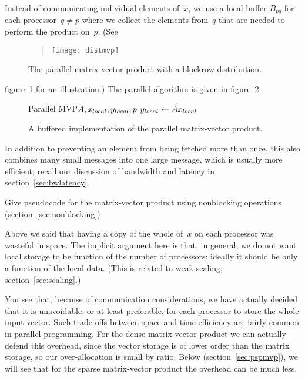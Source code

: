 Instead of communicating individual elements of~$x$, we use a local
buffer $B_{pq}$ for each processor~$q\not=p$ where we collect the
elements from~$q$ that are needed to perform the product on~$p$. (See
\begin{figure}
  \begin{quote}
    \texttt{[image: distmvp]}
  \end{quote}
  \caption{The parallel matrix-vector product with a blockrow
    distribution.}
  \label{fig:distmvp2}
\end{figure}
figure~\ref{fig:distmvp2} for an illustration.) The parallel algorithm
is given in figure~\ref{fig:buffer-pmvp}.
\begin{figure}
\begin{displayprocedure}{Parallel MVP}{$A,x_{\mathrm\scriptstyle local},y_{\mathrm\scriptstyle local},p$}
  $y_{\mathrm\scriptstyle local}\leftarrow A x_{\mathrm\scriptstyle local}$\\
\end{displayprocedure}
  \caption{A buffered implementation of the parallel matrix-vector
    product.}
  \label{fig:buffer-pmvp}
\end{figure}

In addition to preventing an element from being fetched more than
once, this also combines many small messages into one large message,
which is usually more efficient; recall our discussion of bandwidth
and latency in section~\ref{sec:bwlatency}.

\begin{exercise}
  Give pseudocode for the matrix-vector product using 
  nonblocking operations (section~\ref{sec:nonblocking})
\end{exercise}

Above we said that having a copy of the whole of~$x$ on each processor
was wasteful in space. The implicit argument here is that, in general,
we do not want local storage to be function of the number of
processors: ideally it should be only a function of the local
data. (This is related to weak scaling; section~\ref{sec:scaling}.)

You see that, because of communication considerations, we have
actually decided that it is unavoidable, or at least preferable, for
each processor to store the whole input vector.  Such trade-offs
between space and time efficiency are fairly common in parallel
programming. For the dense matrix-vector product we can actually
defend this overhead, since the vector storage is of lower order than
the matrix storage, so our over-allocation is small by ratio. Below
(section~\ref{sec:pspmvp}), we will see that for the sparse
matrix-vector product the overhead can be much less.

